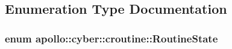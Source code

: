 \subsection{Enumeration Type Documentation}
\hypertarget{namespaceapollo_1_1cyber_1_1croutine_a9b2ec600d9734ed2e857a7235cec5e48}{
\subsubsection[{Routine\-State}]{\setlength{\rightskip}{0pt plus 5cm}enum {\bf apollo\-::cyber\-::croutine\-::\-Routine\-State}\hspace{0.3cm}{\ttfamily [strong]}}}\label{namespaceapollo_1_1cyber_1_1croutine_a9b2ec600d9734ed2e857a7235cec5e48}

